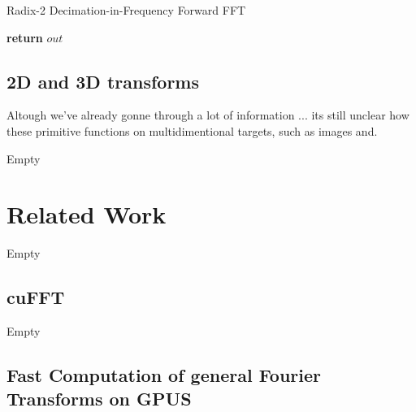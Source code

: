 \documentclass[
  oneside,
  11pt, a4paper,
  footinclude=true,
  headinclude=true,
  cleardoublepage=empty
]{scrbook}
\begin{document}

\begin{algorithm}
    \caption{Radix-2 Decimation-in-Frequency Forward FFT} \label{alg:dif}

    

    \textbf{return} $out$\;
\end{algorithm}

\subsection{2D and 3D transforms}

Altough we've already gonne through a lot of information ... its still unclear how these primitive functions on multidimentional targets, such as images and.

Empty

\section{Related Work}

Empty

\subsection{cuFFT}

Empty

\subsection{Fast Computation of general Fourier Transforms on GPUS}
\end{document}
